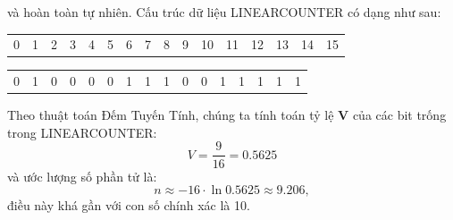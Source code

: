 \documentclass[a4paper,13pt]{article}
\theoremstyle{mytheor}
\begin{document}
\begin{mdframed}
và hoàn toàn tự nhiên. Cấu trúc dữ liệu LINEARCOUNTER có dạng như sau:
\begin{center}
    \begin{tabular}{p{0.4cm}p{0.4cm}p{0.4cm}p{0.4cm}p{0.4cm}p{0.4cm}p{0.4cm}p{0.4cm}p{0.4cm}p{0.4cm}p{0.4cm}p{0.4cm}p{0.4cm}p{0.4cm}p{0.4cm}p{0.4cm}}
        0 & 1 & 2 & 3 & 4 & 5 & 6 & 7 & 8 & 9 & 10 & 11 & 12 & 13 & 14 & 15 %
    \end{tabular}
    \begin{tabular}{|p{0.4cm}|p{0.4cm}|p{0.4cm}|p{0.4cm}|p{0.4cm}|p{0.4cm}|p{0.4cm}|p{0.4cm}|p{0.4cm}|p{0.4cm}|p{0.4cm}|p{0.4cm}|p{0.4cm}|p{0.4cm}|p{0.4cm}|p{0.4cm}|}
        \hline
        0 & 1 & 0 & 0 & 0 & 0 & 1 & 1 & 1 & 0 & 0 & 1 & 1 & 1 & 1 & 1 \\ \cline{1-16} %
    \end{tabular}
\end{center}
\vspace{0.2cm}
Theo thuật toán Đếm Tuyến Tính, chúng ta tính toán tỷ lệ \textbf{V} của các bit trống trong LINEARCOUNTER:
\begin{equation}
    V = \frac{9}{16} = 0.5625
\end{equation}
và ước lượng số phần tử là:
\begin{equation}
    n \approx -16\cdot \ln 0.5625 \approx 9.206,
\end{equation}
điều này khá gần với con số chính xác là 10.
\end{mdframed}
\end{document}
